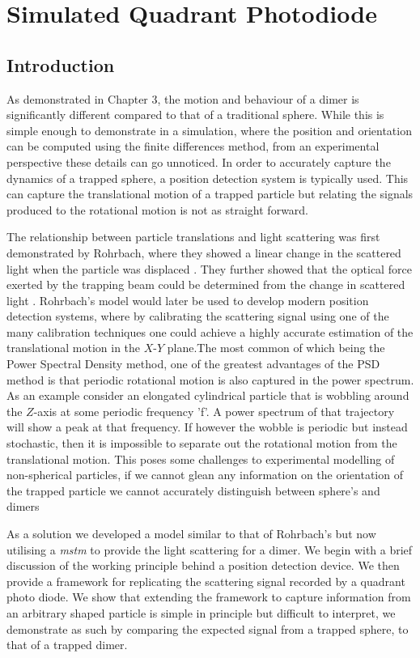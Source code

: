 \chapter{Simulated Quadrant Photodiode}
\label{chapter:simulated_QPD}

\section{Introduction}

As demonstrated in Chapter 3, the motion and behaviour of a dimer 
is significantly different compared to that of a traditional sphere.
While this is simple enough to demonstrate in a simulation, where the 
position and orientation can be computed using the finite differences
method, from an experimental perspective these details can go unnoticed.
In order to accurately capture the dynamics of a trapped sphere, a 
position detection system is typically used. This can capture the 
translational motion of a trapped particle but relating the signals
produced to the rotational motion is not as straight forward. 

The relationship between particle translations and light scattering 
was first demonstrated by Rohrbach, where they showed a linear change 
in the scattered light when the particle was displaced \cite{Rohrbach2002}. They further showed that the optical force exerted by the trapping 
beam could be determined from the change in scattered light \cite{Rohrbach2002}. Rohrbach's model would later be used to develop 
modern position detection systems, where by calibrating the scattering 
signal using one of the many calibration techniques one could achieve a highly accurate estimation of the translational motion in the $X$-$Y$ 
plane.The most common of which being the Power Spectral Density method, 
one of the greatest advantages of the PSD method is that periodic 
rotational motion is also captured in the power spectrum. As an 
example consider an elongated cylindrical particle that is wobbling
around the $Z$-axis at some periodic frequency 'f'. A power spectrum 
of that trajectory will show a peak at that frequency. If however the 
wobble is periodic but instead stochastic, then it is impossible to 
separate out the rotational motion from the translational motion. This
poses some challenges to experimental modelling of non-spherical 
particles, if we cannot glean any information on the orientation
of the trapped particle we cannot accurately distinguish between
sphere's and dimers 

As a solution we developed a model similar to that of Rohrbach's but 
now utilising a \textit{mstm} to provide the light scattering for a 
dimer. We begin with a brief discussion of the working principle 
behind a position detection device. We then provide a framework for replicating the scattering signal recorded by a quadrant photo diode. 
We show that extending the framework to capture information from an 
arbitrary shaped particle is simple in principle but difficult to 
interpret, we demonstrate as such by comparing the expected signal 
from a trapped sphere, to that of a trapped dimer.


